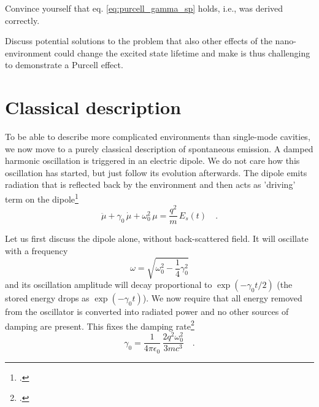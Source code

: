 \begin{questions}
\item Convince yourself that eq. \ref{eq:purcell_gamma_sp} holds, i.e., was derived correctly.

\item Discuss potential solutions to the problem that also other effects of the nano-environment could change the excited state lifetime and make is thus  challenging to demonstrate a Purcell effect.
\end{questions}


\section{Classical description}

To be able to describe more complicated environments than single-mode cavities, we now move to a purely classical description of spontaneous emission. A damped harmonic oscillation is triggered in an electric dipole. We do not care how this oscillation has started, but just follow its evolution afterwards. The dipole emits radiation that is reflected back by the environment and then acts as 'driving' term on the dipole\footcite[chapter 8.5.2]{Novotny-Hecht2012}
\begin{equation}
 \ddot{\mu} + \gamma_0 \, \dot{\mu} + \omega_0^2 \, \mu = \frac{q^2}{m} \, E_s(t) \quad .
\end{equation}

Let us first discuss the dipole alone, without back-scattered field. It will oscillate with a frequency
\begin{equation}
 \omega = \sqrt{\omega_0 ^2 - \frac{1}{4} \gamma_0^2}
\end{equation}
and its oscillation amplitude will decay proportional to $\exp(- \gamma_0 t /2)$ (the stored energy drops as $\exp( - \gamma_0 t)$). We now require that all energy removed from the oscillator is converted into radiated power and no other sources of damping are present. This fixes the damping rate\footcite{Novotny-Hecht2012}
\begin{equation}
\gamma_0 = \frac{1}{4  \pi  \epsilon_0} \, \frac{2 q^2 \omega_0^2}{3 m c^3}
\quad .
\end{equation}


